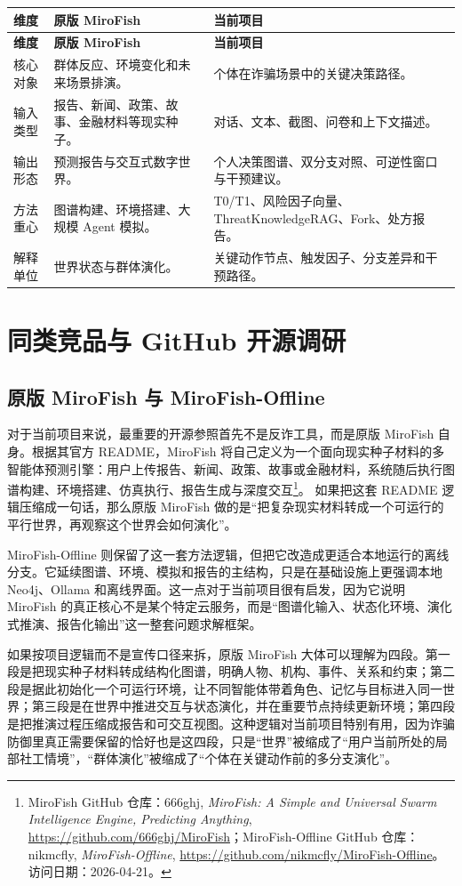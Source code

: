 \documentclass[12pt,a4paper]{ctexart}
\newcommand{\ResearchDate}{2026-04-21}
\newcommand{\SrcMiroFishRepo}{\footnote{MiroFish GitHub 仓库：666ghj, \emph{MiroFish: A Simple and Universal Swarm Intelligence Engine, Predicting Anything}, \url{https://github.com/666ghj/MiroFish}；MiroFish-Offline GitHub 仓库：nikmcfly, \emph{MiroFish-Offline}, \url{https://github.com/nikmcfly/MiroFish-Offline}。访问日期：\ResearchDate。}}
\begin{document}
\begin{longtable}{p{}p{}p{}}
\toprule
\textbf{维度} & \textbf{原版 MiroFish} & \textbf{当前项目} \\
\midrule
\endfirsthead
\toprule
\textbf{维度} & \textbf{原版 MiroFish} & \textbf{当前项目} \\
\midrule
\endhead
核心对象 & 群体反应、环境变化和未来场景排演。 & 个体在诈骗场景中的关键决策路径。 \\
输入类型 & 报告、新闻、政策、故事、金融材料等现实种子。 & 对话、文本、截图、问卷和上下文描述。 \\
输出形态 & 预测报告与交互式数字世界。 & 个人决策图谱、双分支对照、可逆性窗口与干预建议。 \\
方法重心 & 图谱构建、环境搭建、大规模 Agent 模拟。 & T0/T1、风险因子向量、ThreatKnowledgeRAG、Fork、处方报告。 \\
解释单位 & 世界状态与群体演化。 & 关键动作节点、触发因子、分支差异和干预路径。 \\
\bottomrule
\end{longtable}

\section{同类竞品与 GitHub 开源调研}

\subsection{原版 MiroFish 与 MiroFish-Offline}

对于当前项目来说，最重要的开源参照首先不是反诈工具，而是原版 MiroFish 自身。根据其官方 README，MiroFish 将自己定义为一个面向现实种子材料的多智能体预测引擎：用户上传报告、新闻、政策、故事或金融材料，系统随后执行图谱构建、环境搭建、仿真执行、报告生成与深度交互\SrcMiroFishRepo。 如果把这套 README 逻辑压缩成一句话，那么原版 MiroFish 做的是“把复杂现实材料转成一个可运行的平行世界，再观察这个世界会如何演化”。

MiroFish-Offline 则保留了这一套方法逻辑，但把它改造成更适合本地运行的离线分支。它延续图谱、环境、模拟和报告的主结构，只是在基础设施上更强调本地 Neo4j、Ollama 和离线界面。这一点对于当前项目很有启发，因为它说明 MiroFish 的真正核心不是某个特定云服务，而是“图谱化输入、状态化环境、演化式推演、报告化输出”这一整套问题求解框架。

如果按项目逻辑而不是宣传口径来拆，原版 MiroFish 大体可以理解为四段。第一段是把现实种子材料转成结构化图谱，明确人物、机构、事件、关系和约束；第二段是据此初始化一个可运行环境，让不同智能体带着角色、记忆与目标进入同一世界；第三段是在世界中推进交互与状态演化，并在重要节点持续更新环境；第四段是把推演过程压缩成报告和可交互视图。这种逻辑对当前项目特别有用，因为诈骗防御里真正需要保留的恰好也是这四段，只是“世界”被缩成了“用户当前所处的局部社工情境”，“群体演化”被缩成了“个体在关键动作前的多分支演化”。
\end{document}
